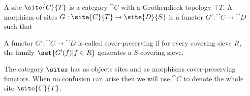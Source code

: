 \begin{definition}[Site]
A site $\site{C}{T}$ is a category $\cat{C}$ with a Grothendieck topology $\top{T}$.
A morphism of sites $G: \site{C}{T} \rightarrow \site{D}{S}$ 
is a functor $G':\cat{C} \rightarrow \cat{D}$ such that 

A functor $G':\cat{C} \rightarrow \cat{D}$ is called cover-preserving
if for every covering sieve $R$, the family
$\set{G'(f) | f\in R}$ generates a $S$-covering sieve.

The category $\sites$ has as objects sites and as morphisms cover-preserving functors.
When no confusion can arise then we will use $\cat{C}$ to denote the whole site $\site{C}{T}$.
\end{definition}